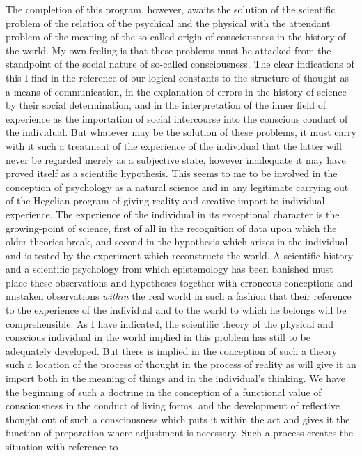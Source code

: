 \documentclass[12pt]{article}
\begin{document}
The completion of this program, however, awaits the
solution of the scientific problem of the relation of the
psychical and the physical with the attendant problem
of the meaning of the so-called origin of consciousness
in the history of the world. My own feeling is that
these problems must be attacked from the standpoint
of the social nature of so-called consciousness. The
clear indications of this I find in the reference of our
logical constants to the structure of thought as a
means of communication, in the explanation of errors
in the history of science by their social determination,
and in the interpretation of the inner field of experience
as the importation of social intercourse into the
conscious conduct of the individual. But whatever
may be the solution of these problems, it must
carry with it such a treatment of the experience of the
individual that the latter will never be regarded merely
as a subjective state, however inadequate it may have
proved itself as a scientific hypothesis. This seems
to me to be involved in the conception of psychology
as a natural science and in any legitimate carrying
out of the Hegelian program of giving reality and
creative import to individual experience. The experience
of the individual in its exceptional character is
the growing-point of science, first of all in the recognition
of data upon which the older theories break, and
second in the hypothesis which arises in the individual
and is tested by the experiment which reconstructs the
world. A scientific history and a scientific psychology
from which epistemology has been banished must place
these observations and hypotheses together with erroneous
conceptions and mistaken observations \emph{within} the
real world in such a fashion that their reference to the
experience of the individual and to the world to which
he belongs will be comprehensible. As I have indicated,
the scientific theory of the physical and conscious individual
in the world implied in this problem has still
to be adequately developed. But there is implied in
the conception of such a theory such a location of the
process of thought in the process of reality as will
give it an import both in the meaning of things and
in the individual's thinking. We have the beginning of
such a doctrine in the conception of a functional value
of consciousness in the conduct of living forms, and the
development of reflective thought out of such a consciousness
which puts it within the act and gives it the
function of preparation where adjustment is necessary.
Such a process creates the situation with reference to
\end{document}
